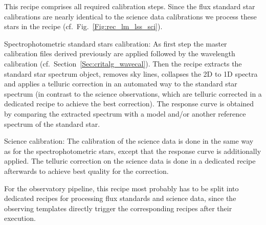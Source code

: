 This recipe comprises all required calibration steps. Since the flux
standard star calibrations are nearly identical to the science data
calibrations we process these stars in the 
recipe (cf.\ Fig.~\ref{Fig:rec_lm_lss_sci}).

Spectrophotometric standard stars calibration: As first step the
master calibration files derived previously are applied followed by
the wavelength calibration (cf.\
Section~\ref{Sec:critalg_wavecal}). Then the recipe extracts the
standard star spectrum object, removes sky lines, collapses the 2D to
1D spectra and applies a telluric correction in an automated way to
the standard star spectrum (in contrast to the science observations,
which are telluric corrected in a dedicated recipe to achieve the best
correction). The response curve is obtained by comparing the extracted
spectrum with a model and/or another reference spectrum of the
standard star.

Science calibration: The calibration of the science data is done in
the same way as for the spectrophotometric stars, except that the
response curve is additionally applied. The telluric correction on the
science data is done in a dedicated recipe afterwards to achieve best
quality for the correction.

For the observatory pipeline, this recipe most probably has to be
split into dedicated recipes for processing flux standards and science
data, since the observing templates directly trigger the corresponding
recipes after their execution.


